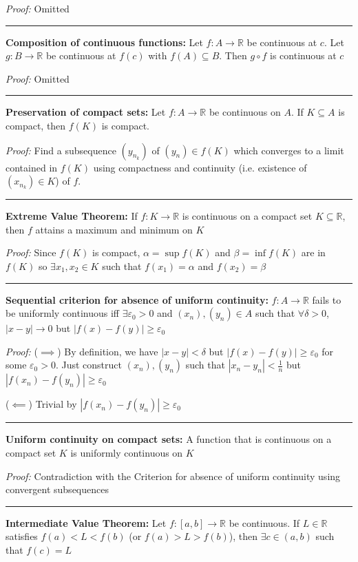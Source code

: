 \documentclass[12pt]{article}
\newcommand{\R}{\mathbb{R}}
\newcommand{\abs}[1]{\left\vert #1 \right\vert}
\newcommand{\ep}{\varepsilon}
\renewcommand{\hline}{\vspace*{10pt} \hrule \vspace*{10pt}}
\begin{document}
        \emph{Proof:} Omitted 

    \hline 

    \textbf{Composition of continuous functions:} Let $f: A \to \R$ be continuous at $c$. Let $g: B \to \R$ be continuous at $f(c)$ with $f(A) \subseteq B$. Then $g \circ f$ is continuous at $c$

        \emph{Proof:} Omitted

    \hline

    \textbf{Preservation of compact sets:} Let $f: A \to \R$ be continuous on $A$. If $K \subseteq A$ is compact, then $f(K)$ is compact. 

        \emph{Proof:} Find a subsequence $(y_{n_k})$ of $(y_n) \in f(K)$ which converges to a limit contained in $f(K)$ using compactness and continuity (i.e. existence of $(x_{n_k}) \in K$) of $f$. 

    \hline

    \textbf{Extreme Value Theorem:} If $f: K \to \R$ is continuous on a compact set $K \subseteq \R$, then $f$ attains a maximum and minimum on $K$

        \emph{Proof:} Since $f(K)$ is compact, $\alpha = \sup f(K)$ and $\beta = \inf f(K)$ are in $f(K)$ so $\exists x_1, x_2 \in K$ such that $f(x_1) = \alpha$ and $f(x_2) = \beta$

    \hline 

    \textbf{Sequential criterion for absence of uniform continuity:} $f: A \to \R$ fails to be uniformly continuous iff $\exists \ep_0 > 0$ and $(x_n), (y_n) \in A$ such that $\forall \delta > 0$, $\abs{x  -y} \to 0$ but $\abs{f(x) - f(y)} \geq \ep_0$ 

        \emph{Proof:} ($\implies$) By definition, we have $\abs{x - y} < \delta$ but $\abs{f(x) - f(y)} \geq \ep_0$ for some $\ep_0 > 0$. Just construct $(x_n), (y_n)$ such that $\abs{x_n - y_n} < \frac{1}{n}$ but $\abs{f(x_n) - f(y_n)} \geq \ep_0$

        ($\impliedby$) Trivial by $\abs{f(x_n) - f(y_n)} \geq \ep_0$ 

    \hline 

    \textbf{Uniform continuity on compact sets:} A function that is continuous on a compact set $K$ is uniformly continuous on $K$

        \emph{Proof:} Contradiction with the Criterion for absence of uniform continuity using convergent subsequences 

    \hline 

    \textbf{Intermediate Value Theorem:} Let $f: [a, b] \to \R$ be continuous. If $L \in \R$ satisfies $f(a) < L < f(b)$ (or $f(a) > L > f(b)$), then $\exists c \in (a, b)$ such that $f(c) = L$
\end{document}
